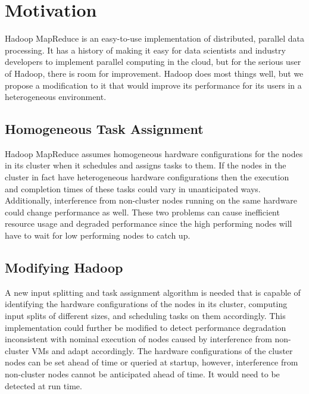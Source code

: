 \section{Motivation}
\label{section:motivation}
Hadoop MapReduce is an easy-to-use implementation of distributed, parallel data 
processing. It has a history of making it easy for data scientists and industry 
developers to implement parallel computing in the cloud, but for the serious 
user of Hadoop, there is room for improvement. Hadoop does most things well, 
but we propose a modification to it that would improve its performance for its
users in a heterogeneous environment.

\subsection{Homogeneous Task Assignment}
Hadoop MapReduce assumes homogeneous hardware configurations for the nodes in 
its cluster when it schedules and assigns tasks to them. If the nodes in the 
cluster in fact have heterogeneous hardware configurations then the execution 
and completion times of these tasks could vary in unanticipated ways. 
Additionally, interference from non-cluster nodes running on the same hardware 
could change performance as well. These two problems can cause inefficient 
resource usage and degraded performance since the high performing nodes
will have to wait for low performing nodes to catch up.

\subsection{Modifying Hadoop}
A new input splitting and task assignment algorithm is needed that is capable of 
identifying the hardware configurations of the nodes in its cluster, computing
input splits of different sizes, and scheduling tasks on them accordingly.
This implementation could further be modified to detect performance degradation
inconsistent with nominal execution of nodes caused by interference from non-cluster
VMs and adapt accordingly. The hardware 
configurations of the cluster nodes can be set ahead of time or queried at startup, however, 
interference from non-cluster nodes cannot be anticipated ahead of time. It would
need to be detected at run time.
